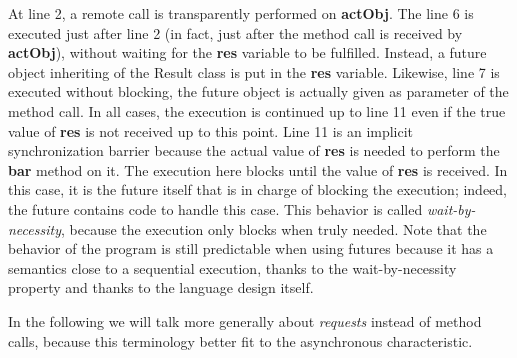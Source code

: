 \documentclass[11pt]{report}
\begin{document}
At line 2, a remote call is transparently performed on \textbf{actObj}. The line 6 is executed just after line 2 (in fact, just after the method call is received by \textbf{actObj}), without waiting for the \textbf{res} variable to be fulfilled. Instead, a future object inheriting of the Result class is put in the \textbf{res} variable. Likewise, line 7 is executed without blocking, the future object is actually given as parameter of the method call. In all cases, the execution is continued up to line 11 even if the true value of \textbf{res} is not received up to this point. Line 11 is an implicit synchronization barrier because the actual value of \textbf{res} is needed to perform the \textbf{bar} method on it. The execution here blocks until the value of \textbf{res} is received. In this case, it is the future itself that is in charge of blocking the execution; indeed, the future contains code to handle this case. This behavior is called \emph{wait-by-necessity}, because the execution only blocks when truly needed. 
Note that the behavior of the program is still predictable when using futures because it has a semantics close to a sequential execution, thanks to the wait-by-necessity property and thanks to the language design itself. 

In the following we will talk more generally about \emph{requests} instead of method calls, because this terminology better fit to the asynchronous characteristic.
\end{document}
